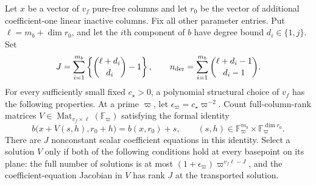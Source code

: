 \begin{lemma}\label{ap:scalar:flags}
Let $x$ be a vector of $v_f$ pure-free columns and let $r_0$ be the
vector of additional coefficient-one linear inactive columns. Fix all
other parameter entries. Put $\ell=m_b+\dim r_0$, and let the $i$th
component of $b$ have degree bound $d_i\in\{1,j\}$. Set
\[
 J=\sum_{i=1}^{m_b}\left\{\binom{\ell+d_i}{d_i}-1\right\},
 \qquad
 n_{\rm der}=\sum_{i=1}^{m_b}\binom{\ell+d_i-1}{d_i-1}.
\]
For every sufficiently small fixed $c_\star>0$, a polynomial structural
choice of $v_f$ has the following properties. At a prime $\varpi$, let
$\epsilon_\varpi=c_\star\varpi^{-2}$. Count full-column-rank matrices
$V\in\operatorname{Mat}_{v_f\times\ell}(\mathbb F_\varpi)$ satisfying
the formal identity
\begin{equation}\label{ap:scalar:plane}
 b\bigl(x+V(s,h),r_0+h\bigr)=b(x,r_0)+s,
       \qquad (s,h)\in\mathbb F_\varpi^{m_b}\times
                           \mathbb F_\varpi^{\dim r_0}.
\end{equation}
There are $J$ nonconstant scalar coefficient equations in this identity.
Select a solution $V$ only if both of the following conditions hold
at every basepoint on its plane: the full number of solutions is at
most $(1+\epsilon_\varpi)\varpi^{v_f\ell-J}$, and the
coefficient-equation Jacobian in $V$ has rank $J$ at the transported
solution.


\end{lemma}
